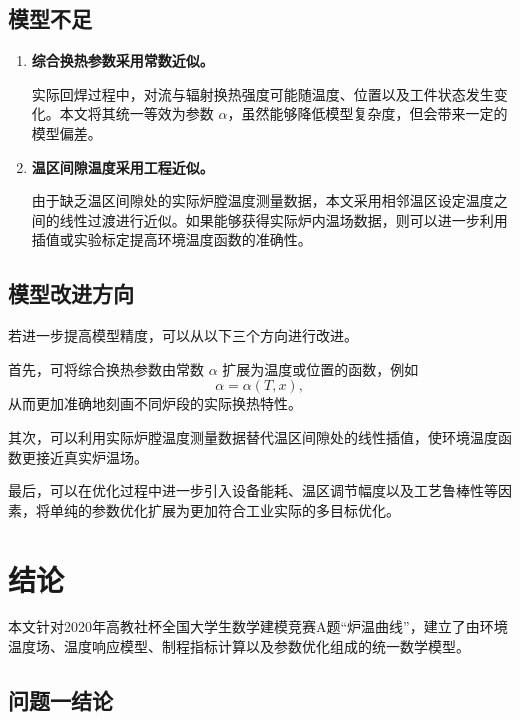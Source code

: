 \documentclass{cumcmthesis}
\begin{document}
\subsection{模型不足}

\begin{enumerate}
    \item \textbf{综合换热参数采用常数近似。}
    
    实际回焊过程中，对流与辐射换热强度可能随温度、位置以及工件状态发生变化。本文将其统一等效为参数 $\alpha$，虽然能够降低模型复杂度，但会带来一定的模型偏差。

    \item \textbf{温区间隙温度采用工程近似。}
    
    由于缺乏温区间隙处的实际炉膛温度测量数据，本文采用相邻温区设定温度之间的线性过渡进行近似。如果能够获得实际炉内温场数据，则可以进一步利用插值或实验标定提高环境温度函数的准确性。

\end{enumerate}


\subsection{模型改进方向}

若进一步提高模型精度，可以从以下三个方向进行改进。

首先，可将综合换热参数由常数 $\alpha$ 扩展为温度或位置的函数，例如
\[
\alpha=\alpha(T,x),
\]
从而更加准确地刻画不同炉段的实际换热特性。

其次，可以利用实际炉膛温度测量数据替代温区间隙处的线性插值，使环境温度函数更接近真实炉温场。

最后，可以在优化过程中进一步引入设备能耗、温区调节幅度以及工艺鲁棒性等因素，将单纯的参数优化扩展为更加符合工业实际的多目标优化。



\section{结论}

本文针对2020年高教社杯全国大学生数学建模竞赛A题“炉温曲线”，建立了由环境温度场、温度响应模型、制程指标计算以及参数优化组成的统一数学模型。

\subsection{问题一结论}
\end{document}
